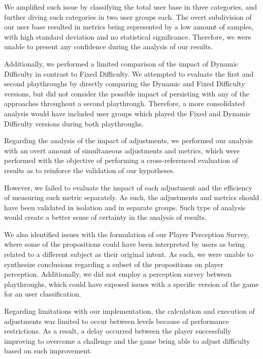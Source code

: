 We amplified such issue by classifying the total user base in three categories, and further diving such categories in two user groups each. The overt subdivision of our user base resulted in metrics being represented by a low amount of samples, with high standard deviation and no statistical significance. Therefore, we were unable to present any confidence during the analysis of our results.

Additionally, we performed a limited comparison of the impact of Dynamic Difficulty in contrast to Fixed Difficulty. We attempted to evaluate the first and second playthroughs by directly comparing the Dynamic and Fixed Difficulty versions, but did not consider the possible impact of persisting with any of the approaches throughout a second playthrough. Therefore, a more consolidated analysis would have included user groups which played the Fixed and Dynamic Difficulty versions during both playthroughs.

Regarding the analysis of the impact of adjustments, we performed our analysis with an overt amount of simultaneous adjustments and metrics, which were performed with the objective of performing a cross-referenced evaluation of results as to reinforce the validation of our hypotheses.

However, we failed to evaluate the impact of each adjustment and the efficiency of measuring each metric separately. As such, the adjustments and metrics should have been validated in isolation and in separate groups. Such type of analysis would create a better sense of certainty in the analysis of results.

We also identified issues with the formulation of our Player Perception Survey, where some of the propositions could have been interpreted by users as being related to a different subject as their original intent. As such, we were unable to synthesize conclusions regarding a subset of the propositions on player perception. Additionally, we did not employ a perception survey between playthroughs, which could have exposed issues with a specific version of the game for an user classification.

Regarding limitations with our implementation, the calculation and execution of adjustments was limited to occur between levels because of performance restrictions. As a result, a delay occurred between the player successfully improving to overcome a challenge and the game being able to adjust difficulty based on such improvement.


